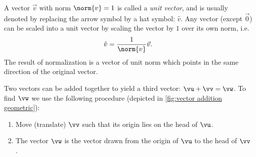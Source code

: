 A vector $\vec{v}$ with norm $\norm{v}=1$ is called a \emph{unit vector}, and is usually denoted by replacing the arrow symbol by a hat symbol: $\hat{v}$. Any vector (except $\vec{0}$) can be scaled into a unit vector by scaling  the vector by $1$ over its own norm, i.e.
\begin{equation}
	\hat{v} = \frac{1}{\norm{v}}\vec{v}.
	\label{eq:normalized vector}
\end{equation}
The result of normalization is a vector of unit norm which points in the same direction of the original vector.

Two vectors can be added together to yield a third vector: $\vu+\vv=\vw$. To find $\vw$ we use the following procedure (depicted in \autoref{fig:vector addition geometric}):
\begin{enumerate}
	\item Move (translate) $\vv$ such that its origin lies on the head of $\vu$.
	\item The vector $\vw$ is the vector drawn from the origin of $\vu$ to the head of $\vv$.
\end{enumerate}

